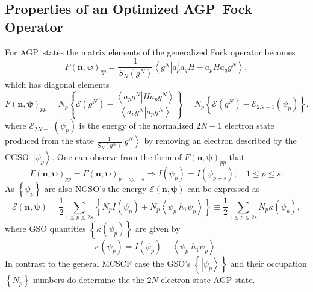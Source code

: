\documentclass[aps,preprint]{revtex4}%
\begin{document}
\subsection{Properties of an Optimized AGP\ Fock Operator\label{AGP_Fock}}

For AGP\ states the matrix elements of the generalized Fock operator becomes
\begin{equation}
F\left(  \bm{n},\bm{\psi}\right)  _{qp}=\frac{1}{S_{N}\left(  g^{N}\right)
}\left\langle \left.  g^{N}\right\vert a_{p}^{\dagger}a_{q}H-a_{p}^{\dagger
}Ha_{q}g^{N}\right\rangle ,
\end{equation}
which has diagonal elements
\begin{equation}
F\left(  \bm{n},\bm{\psi}\right)  _{pp}=N_{p}\left\{  \mathcal{E}\left(
g^{N}\right)  -\frac{\left\langle \left.  a_{p}g^{N}\right\vert Ha_{p}%
g^{N}\right\rangle }{\left\langle \left.  a_{p}g^{N}\right\vert a_{p}%
g^{N}\right\rangle }\right\}  =N_{p}\left\{  \mathcal{E}\left(  g^{N}\right)
-\mathcal{E}_{2N-1}\left(  \psi_{p}\right)  \right\}  ,
\end{equation}
where $\mathcal{E}_{2N-1}\left(  \psi_{p}\right)  $ is the energy of the
normalized $2N-1$ electron state produced from the state $\frac{1}%
{S_{N}\left(  g^{N}\right)  }\left\vert g^{N}\right\rangle $ by removing an
electron described by the CGSO\ $\left\vert \psi_{p}\right\rangle $. One can
observe from the form of $F\left(  \bm{n},\bm{\psi}\right)  _{pp}$ that
\begin{equation}
F\left(  \bm{n},\bm{\psi}\right)  _{pp}=F\left(  \bm{n},\bm{\psi}\right)
_{p+sp+s}\Rightarrow I\left(  \psi_{p}\right)  =I\left(  \psi_{p+s}\right)
;\quad1\leq p\leq s.
\end{equation}
As $\left\{  \psi_{p}\right\}  $ are also NGSO's the energy $\mathcal{E}%
\left(  \bm{n},\bm{\psi}\right)  $ can be expressed as
\begin{equation}
\mathcal{E}\left(  \bm{n},\bm{\psi}\right)  =\frac{1}{2}\sum_{1\leq p\leq
2s}\left\{  N_{p}I\left(  \psi_{p}\right)  +N_{p}\left\langle \left.  \psi
_{p}\right\vert h_{1}\psi_{p}\right\rangle \right\}  \equiv\frac{1}{2}%
{\textstyle\sum\limits_{1\leq p\leq2s}}
N_{p}\kappa\left(  \psi_{p}\right)  ,
\end{equation}
where GSO quantities $\left\{  \kappa\left(  \psi_{p}\right)  \right\}  $ are
given by
\begin{equation}
\kappa\left(  \psi_{p}\right)  =I\left(  \psi_{p}\right)  +\left\langle
\left.  \psi_{p}\right\vert h_{1}\psi_{p}\right\rangle .
\end{equation}
In contrast to the general MCSCF case the GSO's $\left\{  \left\vert \psi
_{p}\right\rangle \right\}  $ and their occupation $\left\{  N_{p}\right\}  $
numbers do determine the the $2N$-electron state AGP state.
\end{document}
